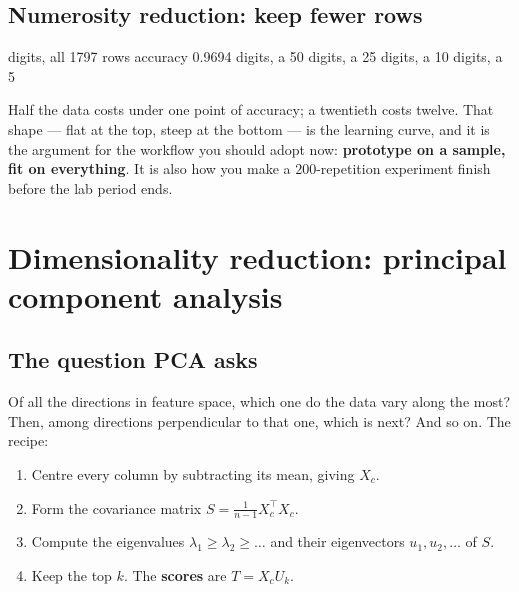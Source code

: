 \documentclass[11pt]{article}
\begin{document}
\subsection{Numerosity reduction: keep fewer rows}
\label{sec:sampling}

\begin{codeout}
digits, all 1797 rows               accuracy 0.9694
digits, a   50%
digits, a   25%
digits, a   10%
digits, a    5%
\end{codeout}

Half the data costs under one point of accuracy; a twentieth costs twelve.
That shape --- flat at the top, steep at the bottom --- is the learning curve,
and it is the argument for the workflow you should adopt now: \textbf{prototype
on a sample, fit on everything}. It is also how you make a $200$-repetition
experiment finish before the lab period ends.

\notesources{\AMLUnitIVSources}

\section{Dimensionality reduction: principal component analysis}
\label{sec:pca}

\subsection{The question PCA asks}

Of all the directions in feature space, which one do the data vary along the
most? Then, among directions perpendicular to that one, which is next? And so
on. The recipe:

\begin{enumerate}[leftmargin=*]
  \item Centre every column by subtracting its mean, giving $X_c$.
  \item Form the covariance matrix
    $S = \frac{1}{n-1} X_c^{\!\top} X_c$.
  \item Compute the eigenvalues $\lambda_1 \ge \lambda_2 \ge \dots$ and their
    eigenvectors $u_1, u_2, \dots$ of $S$.
  \item Keep the top $k$. The \textbf{scores} are $T = X_c U_k$.
\end{enumerate}
\end{document}
